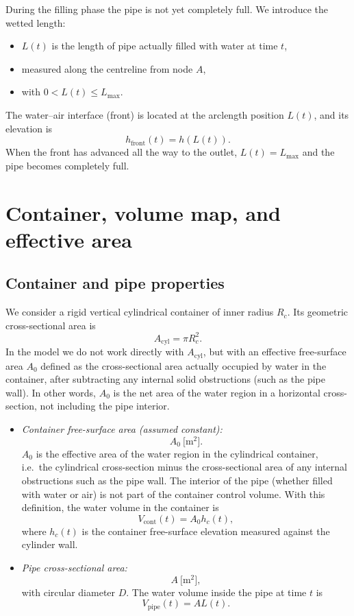 \documentclass[11pt]{article}
\begin{document}
During the filling phase the pipe is not yet completely full. We introduce the wetted length:
\begin{itemize}
  \item $L(t)$ is the length of pipe actually filled with water at time $t$,
  \item measured along the centreline from node $A$,
  \item with $0 < L(t) \le L_{\max}$.
\end{itemize}
The water--air interface (front) is located at the arclength position $L(t)$, and its elevation is
\[
  h_{\text{front}}(t) = h(L(t)).
\]
When the front has advanced all the way to the outlet, $L(t) = L_{\max}$ and the pipe becomes
completely full.

\section{Container, volume map, and effective area}
\label{sec:container}

\subsection{Container and pipe properties}

We consider a rigid vertical cylindrical container of inner radius $R_c$. Its geometric
cross-sectional area is
\[
  A_{\text{cyl}} = \pi R_c^2.
\]
In the model we do not work directly with $A_{\text{cyl}}$, but with an effective free-surface
area $A_0$ defined as the cross-sectional area actually occupied by water in the container,
after subtracting any internal solid obstructions (such as the pipe wall). In other words,
$A_0$ is the net area of the water region in a horizontal cross-section, not including the
pipe interior.

\begin{itemize}
  \item \emph{Container free-surface area (assumed constant):}
  \[
    A_0\ \text{[m$^2$]}.
  \]
  $A_0$ is the effective area of the water region in the cylindrical container, i.e.\ the
  cylindrical cross-section minus the cross-sectional area of any internal obstructions such
  as the pipe wall. The interior of the pipe (whether filled with water or air) is not part of
  the container control volume. With this definition, the water volume in the container is
  \[
    V_{\text{cont}}(t) = A_0 h_c(t),
  \]
  where $h_c(t)$ is the container free-surface elevation measured against the cylinder wall.
  \item \emph{Pipe cross-sectional area:}
  \[
    A\ \text{[m$^2$]},
  \]
  with circular diameter $D$. The water volume inside the pipe at time $t$ is
  \[
    V_{\text{pipe}}(t) = A L(t).
  \]
\end{itemize}
\end{document}
